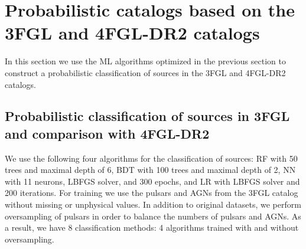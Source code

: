 \section{Probabilistic catalogs based on the 3FGL and 4FGL-DR2 catalogs}

In this section we use the ML algorithms optimized in the previous section to construct a probabilistic
classification of sources in the 3FGL and 4FGL-DR2 catalogs.



\subsection{Probabilistic classification of sources in 3FGL and comparison with 4FGL-DR2}


We use the following four algorithms for the classification of sources: RF with 50 trees and maximal depth of 6, BDT with 100 trees and maximal depth of 2, NN with 11 neurons, LBFGS solver, and 300 epochs, and LR with LBFGS solver and 200 iterations. 
For training we use the pulsars and AGNs from the 3FGL catalog without missing or unphysical values. 
In addition to original datasets, we perform oversampling of pulsars in order to balance the numbers of pulsars and AGNs.
As a result, we have 8 classification methods: 4 algorithms trained with and without oversampling.


\begin{table}[!h]
\centering
\hspace{-0.2cm}
    \vspace{2mm}
    \caption{Testing accuracy of the 4 selected algorithms for classification of 3FGL sources and comparison with associations in the 4FGL-DR2 catalog. 
    ``\_O'' denotes training with oversampling.}
    \label{tab:selected_algs}
\end{table}



